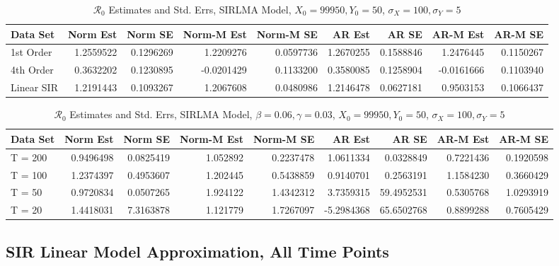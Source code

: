 \message{ !name(draft_v13.tex)}\documentclass[12pt]{article}
\newcommand{\rr}{\ensuremath{\mathcal{R}_0}}
\begin{document}
\begin{table}[H]
	
	\caption{\label{tab:}$\rr$ Estimates and Std. Errs, SIRLMA Model,
		$X_0 = 99950, Y_0 = 50$, $\sigma_X = 100, \sigma_Y = 5$}
	\centering
	\begin{footnotesize}
		\begin{tabular}[t]{l|r|r|r|r|r|r|r|r}
			\hline
			Data Set & Norm Est & Norm SE & Norm-M Est & Norm-M SE & AR Est & AR SE & AR-M Est & AR-M SE\\
			\hline
			1st Order & 1.2559522 & 0.1296269 & 1.2209276 & 0.0597736 & 1.2670255 & 0.1588846 & 1.2476445 & 0.1150267\\
			\hline
			4th Order & 0.3632202 & 0.1230895 & -0.0201429 & 0.1133200 & 0.3580085 & 0.1258904 & -0.0161666 & 0.1103940\\
			\hline
			Linear SIR & 1.2191443 & 0.1093267 & 1.2067608 & 0.0480986 & 1.2146478 & 0.0627181 & 0.9503153 & 0.1066437\\
			\hline
		\end{tabular}
	\end{footnotesize}
\end{table}

\begin{table}[H]
	
	\caption{\label{tab:}$\rr$ Estimates and Std. Errs, SIRLMA Model,
		$\beta = 0.06, \gamma = 0.03$, $X_0 = 99950, Y_0 = 50$, $\sigma_X = 100, \sigma_Y = 5$}
	\centering
	\begin{tabular}[t]{l|r|r|r|r|r|r|r|r}
		\hline
		Data Set & Norm Est & Norm SE & Norm-M Est & Norm-M SE & AR Est & AR SE & AR-M Est & AR-M SE\\
		\hline
		T = 200 & 0.9496498 & 0.0825419 & 1.052892 & 0.2237478 & 1.0611334 & 0.0328849 & 0.7221436 & 0.1920598\\
		\hline
		T = 100 & 1.2374397 & 0.4953607 & 1.202445 & 0.5438859 & 0.9140701 & 0.2563191 & 1.1584230 & 0.3660429\\
		\hline
		T = 50 & 0.9720834 & 0.0507265 & 1.924122 & 1.4342312 & 3.7359315 & 59.4952531 & 0.5305768 & 1.0293919\\
		\hline
		T = 20 & 1.4418031 & 7.3163878 & 1.121779 & 1.7267097 & -5.2984368 & 65.6502768 & 0.8899288 & 0.7605429\\
		\hline
	\end{tabular}
\end{table}

\subsection{SIR Linear Model Approximation, All Time Points}
\end{document}
